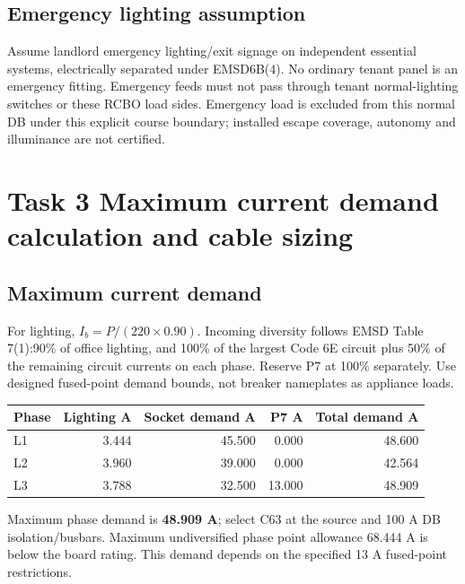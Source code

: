 \documentclass[11pt]{article}
\newcommand{\task}[1]{\section*{#1}}
\begin{document}
\subsection*{Emergency lighting assumption}
Assume landlord emergency lighting/exit signage on independent essential systems, electrically separated under EMSD6B(4). No ordinary tenant panel is an emergency fitting. Emergency feeds must not pass through tenant normal-lighting switches or these RCBO load sides. Emergency load is excluded from this normal DB under this explicit course boundary;  installed escape coverage, autonomy and illuminance are not certified.
\task{Task 3 Maximum current demand calculation and cable sizing}
\subsection*{Maximum current demand}
For lighting, $I_b=P/(220\times 0.90)$. Incoming diversity follows EMSD Table 7(1):90\% of office lighting, and 100\% of the largest Code 6E circuit plus 50\% of the remaining circuit currents on each phase. Reserve P7 at 100\% separately. Use designed fused-point demand bounds, not breaker nameplates as appliance loads.
\begin{center}\begin{tabular}{lrrrr}\toprule
Phase & Lighting A & Socket demand A & P7 A & Total demand A\\\midrule

L1 & 3.444 & 45.500 & 0.000 & 48.600 \\
L2 & 3.960 & 39.000 & 0.000 & 42.564 \\
L3 & 3.788 & 32.500 & 13.000 & 48.909 \\

\bottomrule\end{tabular}\end{center}
Maximum phase demand is \textbf{48.909 A};  select C63 at the source and 100 A DB isolation/busbars. Maximum undiversified phase point allowance 68.444 A is below the board rating. This demand depends on the specified 13 A fused-point restrictions.
\end{document}
